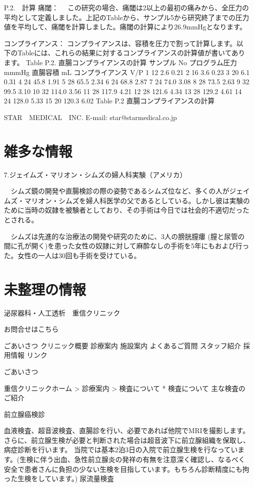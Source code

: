 P.2.　計算
痛閾：
　この研究の場合、痛閾は2以上の最初の痛みから、全圧力の平均として定義しました。上記のTableから、サンプル5から研究終了までの圧力値を平均して、痛閾を計算しました。痛閾の計算により26.9mmHgとなります。


コンプライアンス：
コンプライアンスは、容積を圧力で割って計算します。以下のTableには、これらの結果に対するコンプライアンスの計算値が書いてあります。
Table P.2. 直腸コンプライアンスの計算
サンプル
No 	プログラム圧力
mmmHg 	直腸容積
mL 	コンプライアンス
V/P
1 	12 	2.6 	0.21
2 	16 	3.6 	0.23
3 	20 	6.1 	0.31
4 	24 	45.8 	1.91
5 	28 	65.5 	2.34
6 	24 	68.8 	2.87
7 	24 	74.0 	3.08
8 	28 	73.5 	2.63
9 	32 	99.5 	3.10
10 	32 	114.0 	3.56
11 	28 	117.9 	4.21
12 	28 	121.6 	4.34
13 	28 	129.2 	4.61
14 	24 	128.0 	5.33
15 	20 	120.3 	6.02
Table P.2 直腸コンプライアンスの計算


STAR　MEDICAL　INC.
E-mail: star@starmedical.co.jp


\section{雑多な情報}

7.ジェイムズ・マリオン・シムズの婦人科実験（アメリカ）

　シムズ鏡の開発や直腸検診の際の姿勢であるシムズ位など、多くの人がジェイムズ・マリオン・シムズを婦人科医学の父であるとしている。しかし彼は実験のために当時の奴隷を被験者としており、その手術は今日では社会的不適切だったとされる。

　シムズは先進的な治療法の開発や研究のために、3人の膀胱膣瘻 (膣と尿管の間に孔が開く)を患った女性の奴隷に対して麻酔なしの手術を5年にもおよび行った。女性の一人は30回も手術を受けている。


\section{未整理の情報}

泌尿器科・人工透析　重信クリニック

お問合せはこちら

    ごあいさつ
    クリニック概要
    診療案内
    施設案内
    よくあるご質問
    スタッフ紹介
    採用情報
    リンク

ごあいさつ

重信クリニックホーム > 診療案内 > 検査について
*
検査について
主な検査のご紹介

前立腺癌検診

    血液検査、超音波検査、直腸診を行い、必要であれば他院でMRIを撮影します。さらに、前立腺生検が必要と判断された場合は超音波下に前立腺組織を保取し、病症診断を行います。
    当院では基本2泊3日の入院で前立腺生検を行なっています。(生検に伴う出血、急性前立腺炎の発祥の有無を注意深く確認し、なるべく安全で患者さんに負担の少ない生検を目指しています。もちろん診断精度にも拘った生検をしています。)
尿流量検査

